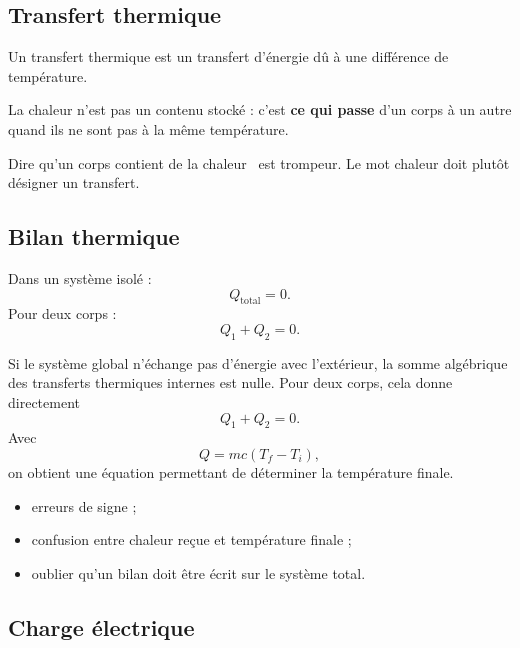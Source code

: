 \documentclass[11pt,a4paper]{article}
\begin{document}
\subsection{Transfert thermique}

\begin{sens}
Un transfert thermique est un transfert d'énergie dû à une différence de température.
\end{sens}

\begin{imagem}
La chaleur n'est pas un contenu stocké :
c'est \textbf{ce qui passe} d'un corps à un autre quand ils ne sont pas à la même température.
\end{imagem}

\begin{fausseintuition}
Dire qu'un corps \og contient de la chaleur \fg\ est trompeur.
Le mot chaleur doit plutôt désigner un transfert.
\end{fausseintuition}

\subsection{Bilan thermique}

\begin{bilan}
Dans un système isolé :
\[
Q_{\text{total}}=0.
\]
Pour deux corps :
\[
Q_1+Q_2=0.
\]
\end{bilan}

\begin{demo}
Si le système global n'échange pas d'énergie avec l'extérieur,
la somme algébrique des transferts thermiques internes est nulle.
Pour deux corps, cela donne directement
\[
Q_1+Q_2=0.
\]
Avec
\[
Q=mc(T_f-T_i),
\]
on obtient une équation permettant de déterminer la température finale.
\end{demo}

\begin{erreurs}
\begin{itemize}
    \item erreurs de signe ;
    \item confusion entre chaleur reçue et température finale ;
    \item oublier qu'un bilan doit être écrit sur le système total.
\end{itemize}
\end{erreurs}

\subsection{Charge électrique}
\end{document}
